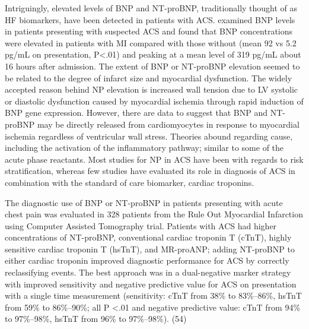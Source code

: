 \documentclass[14pt,a4paper,onecolumn]{extarticle}
\begin{document}
Intriguingly, elevated levels of BNP and NT-proBNP, traditionally thought of as HF biomarkers, have been detected in patients with ACS. \citep{bib3135} examined BNP levels in patients presenting with suspected ACS and found that BNP concentrations were elevated in patients with MI compared with those without (mean 92 vs 5.2 pg/mL on presentation, P<.01) and peaking at a mean level of 319 pg/mL about 16 hours after admission. The extent of BNP or NT-proBNP elevation seemed to be related to the degree of infarct size and myocardial dysfunction. The widely accepted reason behind NP elevation is increased wall tension due to LV systolic or diastolic dysfunction caused by myocardial ischemia through rapid induction of BNP gene expression. However, there are data to suggest that BNP and NT-proBNP may be directly released from cardiomyocytes in response to myocardial ischemia regardless of ventricular wall stress. Theories abound regarding cause, including the activation of the inflammatory pathway; similar to some of the acute phase reactants.  Most studies for NP in ACS have been with regards to risk stratification, whereas few studies have evaluated its role in diagnosis of ACS in combination with the standard of care biomarker, cardiac troponins. \citep{Gaggin2014}

The diagnostic use of BNP or NT-proBNP in patients presenting with acute chest pain was evaluated in 328 patients from the Rule Out Myocardial Infarction using Computer Assisted Tomography trial. Patients with ACS had higher concentrations of NT-proBNP, conventional cardiac troponin T (cTnT), highly sensitive cardiac troponin T (hsTnT), and MR-proANP; adding NT-proBNP to either cardiac troponin improved diagnostic performance for ACS by correctly reclassifying events. The best approach was in a dual-negative marker strategy with improved sensitivity and negative predictive value for ACS on presentation with a single time measurement (sensitivity: cTnT from 38\% to 83\%–86\%, hsTnT from 59\% to 86\%–90\%; all P <.01 and negative predictive value: cTnT from 94\% to 97\%–98\%, hsTnT from 96\% to 97\%–98\%). (54)
\end{document}
